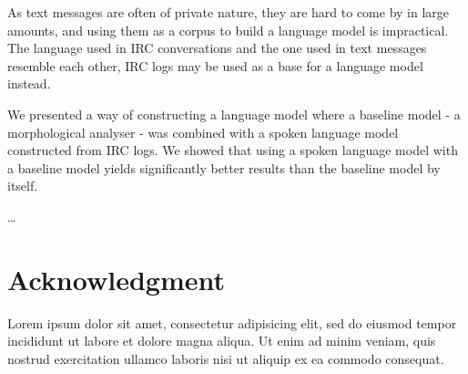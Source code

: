 \documentclass[a4paper,conference]{IEEEtran}
\begin{document}
As text messages are often of private nature, they are hard to come by in large amounts, and using them as a corpus to build a language model is impractical. The language used in IRC conversations and the one used in text messages resemble each other, IRC logs may be used as a base for a language model instead. 

We presented a way of constructing a language model where a baseline model - a morphological analyser - was combined with a spoken language model constructed from IRC logs. We showed that using a spoken language model with a baseline model yields significantly better results than the baseline model by itself.

\ldots \balance
\section*{Acknowledgment}

Lorem ipsum dolor sit amet, consectetur adipisicing elit, sed do eiusmod tempor incididunt ut labore et dolore magna aliqua. Ut enim ad minim veniam, quis nostrud exercitation ullamco laboris nisi ut aliquip ex ea commodo consequat.

\






\end{document}

